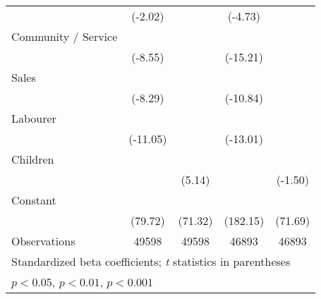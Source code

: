 {\begin{tabular}{l*{4}{c}}
                    &     (-2.02)         &                     &     (-4.73)         &                     \\
[1em]
Community / Service &            \sym{***}&                     &            \sym{***}&                     \\
                    &     (-8.55)         &                     &    (-15.21)         &                     \\
[1em]
Sales               &            \sym{***}&                     &            \sym{***}&                     \\
                    &     (-8.29)         &                     &    (-10.84)         &                     \\
[1em]
Labourer            &            \sym{***}&                     &            \sym{***}&                     \\
                    &    (-11.05)         &                     &    (-13.01)         &                     \\
[1em]
Children            &                     &            \sym{***}&                     &                     \\
                    &                     &      (5.14)         &                     &     (-1.50)         \\
[1em]
Constant            &            \sym{***}&            \sym{***}&            \sym{***}&            \sym{***}\\
                    &     (79.72)         &     (71.32)         &    (182.15)         &     (71.69)         \\
\hline
Observations        &       49598         &       49598         &       46893         &       46893         \\
\hline\hline
\multicolumn{5}{l}{\footnotesize Standardized beta coefficients; \textit{t} statistics in parentheses}\\
\multicolumn{5}{l}{\footnotesize \sym{*} \(p<0.05\), \sym{**} \(p<0.01\), \sym{***} \(p<0.001\)}\\
\end{tabular}
}
